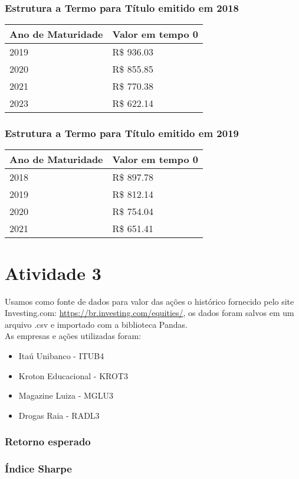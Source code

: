 \documentclass[
	11pt,				%
	openright,			%
	oneside,			%
	a4paper,			%
	english,			%
	french,				%
	spanish,			%
	brazil,				%
	]{abntex2}
\begin{document}
\newpage
\subsection{Estrutura a Termo para Título emitido em 2018}
\begin{tabular}{ll}
\toprule
\multicolumn{1}{c}{Ano de Maturidade} & Valor em tempo 0 \\
\midrule
2019 & R\$ 936.03 \\
2020 & R\$ 855.85 \\
2021 & R\$ 770.38\\
2023 & R\$ 622.14
\end{tabular}
\begin{figure}[h]
\end{figure}

\newpage
\subsection{Estrutura a Termo para Título emitido em 2019}
\begin{tabular}{ll}
\toprule
\multicolumn{1}{c}{Ano de Maturidade} & Valor em tempo 0 \\
\midrule
2018 & R\$ 897.78 \\
2019 & R\$ 812.14 \\
2020 & R\$ 754.04\\
2021 & R\$ 651.41
\end{tabular}

\begin{figure}[h]
\end{figure}

\chapter{Atividade 3}
Usamos como fonte de dados para valor das ações o histórico fornecido pelo site Investing.com: \url{https://br.investing.com/equities/}, os dados foram salvos em um arquivo .csv e importado com a biblioteca Pandas.\\
As empresas e ações utilizadas foram: \\
\begin{itemize}
	\item Itaú Unibanco - ITUB4
	\item Kroton Educacional - KROT3
	\item Magazine Luiza - MGLU3
	\item Drogas Raia - RADL3
\end{itemize}

\subsection{Retorno esperado}
\begin{figure}[h]
\end{figure}

\subsection{Índice Sharpe}
\begin{figure}[h]
\end{figure}
\end{document}
